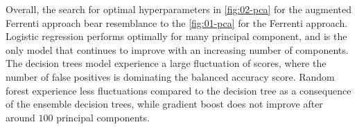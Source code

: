 Overall, the search for optimal hyperparameters in \autoref{fig:02-pca} for the augmented Ferrenti approach bear resemblance to the \autoref{fig:01-pca} for the Ferrenti approach. Logistic regression performs optimally for many principal component, and is the only model that continues to improve with an increasing number of components. The decision trees model experience a large fluctuation of scores, where the number of false positives is dominating the balanced accuracy score. Random forest experience less fluctuations compared to the decision tree as a consequence of the ensemble decision trees, while gradient boost does not improve after around $100$ principal components.
\begin{table}[!ht]
\centering
\caption{A table of the optimal number of principal components and the respective scores (standard deviation), as visualized in the dash-dotted line in \autoref{fig:02-pca}.}
\label{tab:02-pc}
\noindent{}
\end{table}

